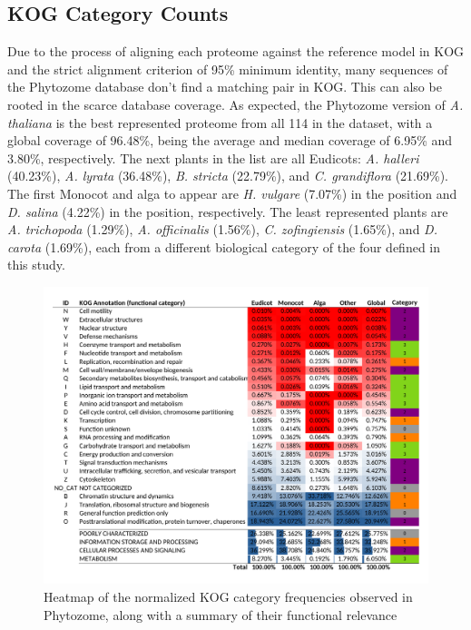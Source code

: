 \subsection{KOG Category Counts}
\label{sec:results.kogcount}


Due to the process of aligning each proteome against the 
reference model in KOG and the strict alignment criterion 
of 95\% minimum identity, many sequences of the Phytozome 
database don't find a matching pair in KOG. This can also 
be rooted in the scarce database coverage. As expected, the
Phytozome version of \emph{A. thaliana}  is the best 
represented proteome from 
all 114 in the dataset, with a global coverage of 96.48\%, 
being the average and median coverage of 6.95\% and 
3.80\%, respectively. The next 
plants in the list are all Eudicots: \emph{A. halleri} (40.23\%), 
\emph{A. lyrata} (36.48\%), \emph{B. stricta} (22.79\%), and 
\emph{C. grandiflora} (21.69\%). The first Monocot and alga 
to appear are \emph{H. vulgare} (7.07\%) in the  position 
and \emph{D. salina} (4.22\%) in the  position, 
respectively. The least represented plants are 
\emph{A. trichopoda} (1.29\%), \emph{A. officinalis} (1.56\%), 
\emph{C. zofingiensis} (1.65\%), and \emph{D. carota} (1.69\%), 
each from a different biological category of the four 
defined in this study.

\begin{figure}[htp!]
\centering
\includegraphics[width=\textwidth]{figures/Heatmap_EMAO}
\caption{Heatmap of the normalized KOG category frequencies 
observed in Phytozome, along with a summary of their 
functional relevance}
\label{fig:EMAO}
\end{figure}


